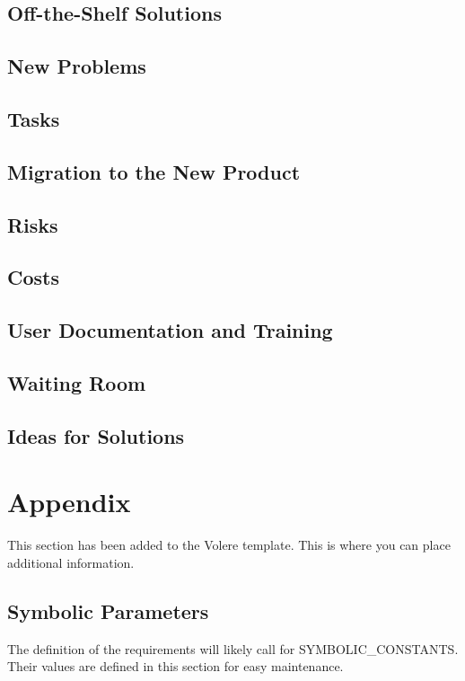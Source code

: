 \documentclass[12pt, titlepage]{article}
\begin{document}
    	\subsection{Off-the-Shelf Solutions}

    	\subsection{New Problems}

    	\subsection{Tasks}

    	\subsection{Migration to the New Product}

    	\subsection{Risks}

    	\subsection{Costs}

    	\subsection{User Documentation and Training}

    	\subsection{Waiting Room}

    	\subsection{Ideas for Solutions}

	\newpage
    

    


    \section{Appendix}

    This section has been added to the Volere template.  This is where you can place
    additional information.

    \subsection{Symbolic Parameters}

    The definition of the requirements will likely call for SYMBOLIC\_CONSTANTS.
    Their values are defined in this section for easy maintenance.
\end{document}
